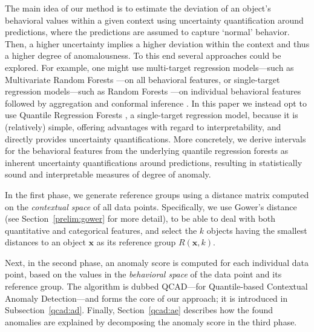 \documentclass[pdflatex,sn-basic]{sn-jnl}%
\theoremstyle{thmstyleone}%
\theoremstyle{thmstyletwo}%
\theoremstyle{thmstylethree}%
\begin{document}
The main idea of our method is to estimate the deviation of an object’s behavioral values within a given context using uncertainty quantification around predictions, where the predictions are assumed to capture `normal' behavior. Then, a higher uncertainty implies a higher deviation within the context and thus a higher degree of anomalousness. To this end several approaches could be explored. For example, one might use multi-target regression models---such as Multivariate Random Forests \citep{segal2011multivariate}---on all behavioral features, or single-target regression models---such as Random Forests \citep{breiman2001random}---on individual behavioral features followed by aggregation and conformal inference \citep{lei2018distribution}. In this paper we instead opt to use Quantile Regression Forests \citep{meinshausen2006quantile}, a single-target regression model, because it is (relatively) simple, offering advantages with regard to interpretability, and directly provides uncertainty quantifications. More concretely, we derive intervals for the behavioral features from the underlying quantile regression forests as inherent uncertainty quantifications around predictions, resulting in statistically sound and interpretable measures of degree of anomaly.

In the first phase, we generate reference groups using a distance matrix computed on the \emph{contextual space} of all data points. Specifically, we use Gower's distance \citep{gower1971general} (see Section~\ref{prelim:gower} for more detail), to be able to deal with both quantitative and categorical features, and select the $k$ objects having the smallest distances to an object $\mathbf{x}$ as its reference group $R(\mathbf{x}, k)$.

Next, in the second phase, an anomaly score is computed for each individual data point, based on the values in the \emph{behavioral space} of the data point and its reference group. The algorithm is dubbed QCAD---for Quantile-based Contextual Anomaly Detection---and forms the core of our approach; it is introduced in Subsection~\ref{qcad:ad}.
Finally, Section~\ref{qcad:ae} describes how the found anomalies are explained by decomposing the anomaly score in the third phase.
\end{document}
